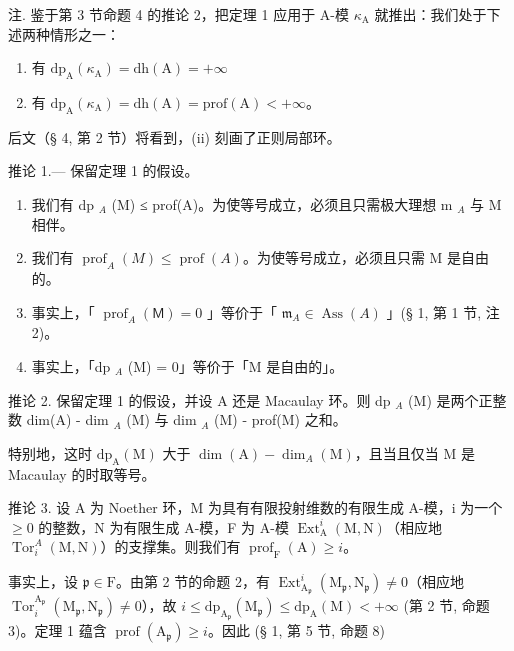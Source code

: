 注. 鉴于第 3 节命题 4 的推论 2，把定理 1 应用于 A-模 \(\kappa_{\mathrm{A}}\) 就推出：我们处于下述两种情形之一：

\begin{enumerate}
\def\labelenumi{(\roman{enumi})}
\item
  有 \(\mathrm{dp}_{\mathrm{A}}(\kappa_{\mathrm{A}}) = \mathrm{dh}(\mathrm{A}) = +\infty\)
\item
  有 \(\mathrm{dp}_{\mathrm{A}}(\kappa_{\mathrm{A}}) = \mathrm{dh}(\mathrm{A}) = \mathrm{prof}(\mathrm{A}) < +\infty\)。
\end{enumerate}

后文（§ 4, 第 2 节）将看到，(ii) 刻画了正则局部环。

推论 1.--- 保留定理 1 的假设。

\begin{enumerate}
\def\labelenumi{\alph{enumi})}
\item
  我们有 dp \(_{A}\) (M) ≤ prof(A)。为使等号成立，必须且只需极大理想 m \(_{A}\) 与 M 相伴。
\item
  我们有 \(\operatorname{prof}_A(M) \leqslant \operatorname{prof}(A)\)。为使等号成立，必须且只需 M 是自由的。
\item
  事实上，「 \(\operatorname{prof}_{A}(\mathsf{M}) = 0\) 」等价于「 \(\mathfrak{m}_A \in \operatorname{Ass}(A)\) 」(§ 1, 第 1 节, 注 2)。
\item
  事实上，「dp \(_{A}\) (M) = 0」等价于「M 是自由的」。
\end{enumerate}

推论 2. 保留定理 1 的假设，并设 A 还是 Macaulay 环。则 dp \(_{A}\) (M) 是两个正整数 dim(A) - dim \(_{A}\) (M) 与 dim \(_{A}\) (M) - prof(M) 之和。

特别地，这时 \(\mathrm{dp}_{\mathrm{A}}(\mathrm{M})\) 大于 \(\dim (\mathrm{A}) - \dim_{A}(\mathrm{M})\)，且当且仅当 M 是 Macaulay 的时取等号。

推论 3. 设 A 为 Noether 环，M 为具有有限投射维数的有限生成 A-模，i 为一个 \(\geqslant 0\) 的整数，N 为有限生成 A-模，F 为 A-模 \(\operatorname{Ext}_{\mathrm{A}}^{i}(\mathrm{M},\mathrm{N})\)（相应地 \(\operatorname{Tor}_{i}^{A}(\mathrm{M},\mathrm{N})\)）的支撑集。则我们有 \(\operatorname{prof}_{\mathrm{F}}(\mathrm{A}) \geqslant i\)。

事实上，设 \(\mathfrak{p} \in \mathrm{F}\)。由第 2 节的命题 2，有 \(\operatorname{Ext}_{\mathrm{A}_{\mathfrak{p}}}^{i}(\mathrm{M}_{\mathfrak{p}}, \mathrm{N}_{\mathfrak{p}}) \neq 0\)（相应地 \(\operatorname{Tor}_{i}^{\mathrm{A}_{\mathfrak{p}}}(\mathrm{M}_{\mathfrak{p}}, \mathrm{N}_{\mathfrak{p}}) \neq 0\)），故 \(i \leqslant \mathrm{dp}_{\mathrm{A}_{\mathfrak{p}}}(\mathrm{M}_{\mathfrak{p}}) \leqslant \mathrm{dp}_{\mathrm{A}}(\mathrm{M}) < +\infty\) (第 2 节, 命题 3)。定理 1 蕴含 \(\operatorname{prof}(\mathrm{A}_{\mathfrak{p}}) \geqslant i\)。因此 (§ 1, 第 5 节, 命题 8)

